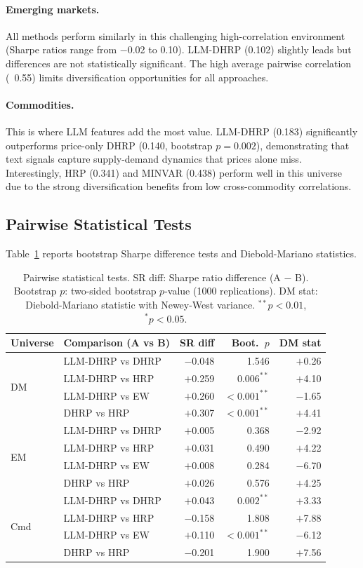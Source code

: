 \documentclass[11pt]{article}
\begin{document}
\paragraph{Emerging markets.} All methods perform similarly in this challenging high-correlation environment (Sharpe ratios range from $-$0.02 to 0.10). LLM-DHRP (0.102) slightly leads but differences are not statistically significant. The high average pairwise correlation (~0.55) limits diversification opportunities for all approaches.

\paragraph{Commodities.} This is where LLM features add the most value. LLM-DHRP (0.183) significantly outperforms price-only DHRP (0.140, bootstrap $p = 0.002$), demonstrating that text signals capture supply-demand dynamics that prices alone miss. Interestingly, HRP (0.341) and MINVAR (0.438) perform well in this universe due to the strong diversification benefits from low cross-commodity correlations.

\subsection{Pairwise Statistical Tests}

Table~\ref{tab:pairwise} reports bootstrap Sharpe difference tests and Diebold-Mariano statistics.

\begin{table}[t]
\centering
\caption{Pairwise statistical tests. SR diff: Sharpe ratio difference (A $-$ B). Bootstrap $p$: two-sided bootstrap $p$-value (1000 replications). DM stat: Diebold-Mariano statistic with Newey-West variance. $^{**}p < 0.01$, $^*p < 0.05$.}
\label{tab:pairwise}
\small
\begin{tabular}{llrrr}
\toprule
Universe & Comparison (A vs B) & SR diff & Boot.\ $p$ & DM stat \\
\midrule
\multirow{4}{*}{DM} & LLM-DHRP vs DHRP & $-$0.048 & 1.546 & $+$0.26 \\
& LLM-DHRP vs HRP & $+$0.259 & $0.006^{**}$ & $+$4.10 \\
& LLM-DHRP vs EW & $+$0.260 & $<0.001^{**}$ & $-$1.65 \\
& DHRP vs HRP & $+$0.307 & $<0.001^{**}$ & $+$4.41 \\
\midrule
\multirow{4}{*}{EM} & LLM-DHRP vs DHRP & $+$0.005 & 0.368 & $-$2.92 \\
& LLM-DHRP vs HRP & $+$0.031 & 0.490 & $+$4.22 \\
& LLM-DHRP vs EW & $+$0.008 & 0.284 & $-$6.70 \\
& DHRP vs HRP & $+$0.026 & 0.576 & $+$4.25 \\
\midrule
\multirow{4}{*}{Cmd} & LLM-DHRP vs DHRP & $+$0.043 & $0.002^{**}$ & $+$3.33 \\
& LLM-DHRP vs HRP & $-$0.158 & 1.808 & $+$7.88 \\
& LLM-DHRP vs EW & $+$0.110 & $<0.001^{**}$ & $-$6.12 \\
& DHRP vs HRP & $-$0.201 & 1.900 & $+$7.56 \\
\bottomrule
\end{tabular}
\end{table}
\end{document}

